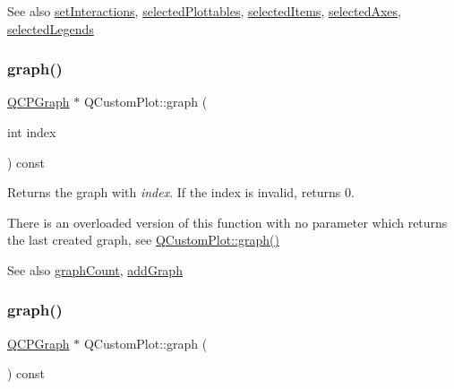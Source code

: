 \begin{DoxySeeAlso}{See also}
\mbox{\hyperlink{class_q_custom_plot_a5ee1e2f6ae27419deca53e75907c27e5}{set\+Interactions}}, \mbox{\hyperlink{class_q_custom_plot_a747faaab57c56891e901a1e97fa4359a}{selected\+Plottables}}, \mbox{\hyperlink{class_q_custom_plot_afda487bcf2d6cf1a57173d82495e29ba}{selected\+Items}}, \mbox{\hyperlink{class_q_custom_plot_a7e6b07792b1cb2c31681596582d14dbe}{selected\+Axes}}, \mbox{\hyperlink{class_q_custom_plot_ac87624ddff1cbf4064781a8e8ae321c4}{selected\+Legends}} 
\end{DoxySeeAlso}
\mbox{\label{class_q_custom_plot_a6ecae130f684b25276fb47bd3a5875c6}} 
\subsubsection{\texorpdfstring{graph()}{graph()}\hspace{0.1cm}{\footnotesize\ttfamily [1/2]}}
{\footnotesize\ttfamily \mbox{\hyperlink{class_q_c_p_graph}{Q\+C\+P\+Graph}} $\ast$ Q\+Custom\+Plot\+::graph (\begin{DoxyParamCaption}\item[{int}]{index }\end{DoxyParamCaption}) const}

Returns the graph with {\itshape index}. If the index is invalid, returns 0.

There is an overloaded version of this function with no parameter which returns the last created graph, see \mbox{\hyperlink{class_q_custom_plot_a6ecae130f684b25276fb47bd3a5875c6}{Q\+Custom\+Plot\+::graph()}}

\begin{DoxySeeAlso}{See also}
\mbox{\hyperlink{class_q_custom_plot_a5e1787cdde868c4d3790f9ebc8207d90}{graph\+Count}}, \mbox{\hyperlink{class_q_custom_plot_a6fb2873d35a8a8089842d81a70a54167}{add\+Graph}} 
\end{DoxySeeAlso}
\mbox{\label{class_q_custom_plot_aac190865a67f19af3fdf2136774997af}} 
\subsubsection{\texorpdfstring{graph()}{graph()}\hspace{0.1cm}{\footnotesize\ttfamily [2/2]}}
{\footnotesize\ttfamily \mbox{\hyperlink{class_q_c_p_graph}{Q\+C\+P\+Graph}} $\ast$ Q\+Custom\+Plot\+::graph (\begin{DoxyParamCaption}{ }\end{DoxyParamCaption}) const}

